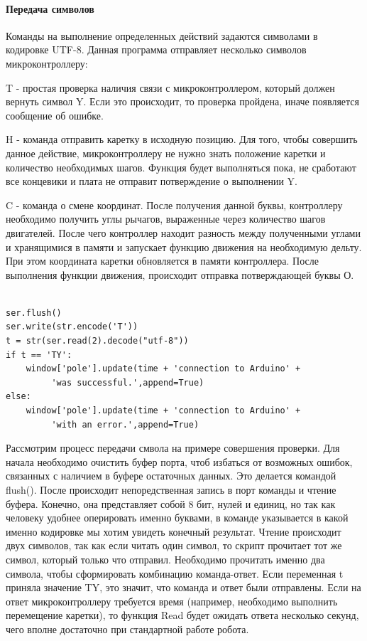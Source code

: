 \paragraph{Передача символов}

Команды на выполнение определенных действий задаются символами в кодировке UTF-8. Данная программа отправляет несколько символов микроконтроллеру:

T - простая проверка наличия связи с микроконтроллером, который должен вернуть символ Y. Если это происходит, то проверка пройдена, иначе появляется сообщение об ошибке.

H - команда отправить каретку в исходную позицию. Для того, чтобы совершить данное действие, микроконтроллеру не нужно знать положение каретки и количество необходимых шагов. Функция будет выполняться пока, не сработают все концевики и плата не отправит потверждение о выполнении Y.

C - команда о смене координат. После получения данной буквы, контроллеру необходимо получить углы рычагов, выраженные через количество шагов двигателей. После чего контроллер находит разность между полученными углами и хранящимися в памяти и запускает функцию движения на необходимую дельту. При этом координата каретки обновляется в памяти контроллера. После выполнения функции движения, происходит отправка потверждающей буквы О.

\begin{lstlisting}[style=python,caption=Отправка символа через параллельный порт]

ser.flush()
ser.write(str.encode('T'))
t = str(ser.read(2).decode("utf-8"))
if t == 'TY':
    window['pole'].update(time + 'connection to Arduino' + 
         'was successful.',append=True)
else:
    window['pole'].update(time + 'connection to Arduino' + 
         'with an error.',append=True)

\end{lstlisting}

Рассмотрим процесс передачи смвола на примере совершения проверки. Для начала необходимо очистить буфер порта, чтоб избаться от возможных ошибок, связанных с наличием в буфере остаточных данных. Это делается командой flush(). После происходит непоредственная запись в порт команды и чтение буфера. Конечно, она представляет собой 8 бит, нулей и единиц, но так как человеку удобнее оперировать именно буквами, в команде указывается в какой именно кодировке мы хотим увидеть конечный результат. Чтение происходит двух символов, так как если читать один символ, то скрипт прочитает тот же символ, который только что отправил. Необходимо прочитать именно два символа, чтобы сформировать комбинацию команда-ответ. Если переменная t приняла значение TY, это значит, что команда и ответ были отправлены. Если на ответ микроконтроллеру требуется время (например, необходимо выполнить перемещение каретки), то функция Read будет ожидать ответа несколько секунд, чего вполне достаточно при стандартной работе робота.  

